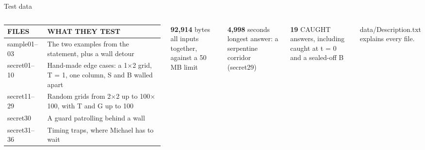 \documentclass[aspectratio=169,11pt]{beamer}
\begin{document}
\begin{frame}{Test data}
  \begin{columns}[c]
      \small\renewcommand{\arraystretch}{1.5}
      \begin{tabular}{@{}l >{\raggedright\arraybackslash}p{5.6cm}@{}}
        \textcolor{amber}{\ttfamily\scriptsize FILES} & \textcolor{amber}{\ttfamily\scriptsize WHAT THEY TEST} \\ \hline
        sample01--03 & The two examples from the statement, plus a wall detour \\
        secret01--10 & Hand-made edge cases: a 1$\times$2 grid, T = 1, one column, S and B walled apart \\
        secret11--29 & Random grids from 2$\times$2 up to 100$\times$100, with T and G up to 100 \\
        secret30 & A guard patrolling behind a wall \\
        secret31--36 & Timing traps, where Michael has to wait \\
      \end{tabular}
      {\Large\bfseries 92,914} {\small bytes}\\
      {\scriptsize\color{dim}all inputs together, against a 50 MB limit}\par\medskip
      {\Large\bfseries 4,998} {\small seconds}\\
      {\scriptsize\color{dim}longest answer: a serpentine corridor (secret29)}\par\medskip
      {\Large\bfseries 19} {\small CAUGHT}\\
      {\scriptsize\color{dim}answers, including caught at t = 0 and a sealed-off B}\par\medskip
      {\scriptsize\color{dim}data/Description.txt explains every file.}
  \end{columns}
\end{frame}
\end{document}
